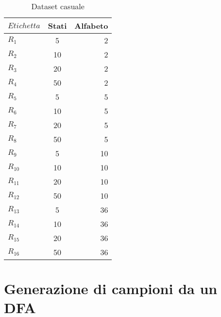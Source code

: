 \begin{table}[htp]
\centering 
\begin{tabular}{lcr} 
\toprule
$Etichetta$ & Stati & Alfabeto  \\
 \midrule
 $R_{1}$ & 5 & 2 \\
 $R_{2}$ & 10 & 2  \\
 $R_{3}$ & 20 & 2  \\
 $R_{4}$ & 50 & 2\\
 $R_{5}$ & 5 & 5\\
  $R_{6}$ & 10 & 5  \\
 
 $R_{7}$ & 20 & 5  \\

 $R_{8}$ & 50 & 5 \\
 
  $R_{9}$ & 5 & 10  \\

 $R_{10}$ & 10 & 10  \\
 $R_{11}$ & 20 & 10\\
 
 $R_{12}$ & 50 & 10 \\
 
 $R_{13}$ & 5 & 36 \\
    
 $R_{14}$ & 10 & 36 \\
 
 $R_{15}$ & 20 & 36 \\

 $R_{16}$ & 50 & 36 \\
 \bottomrule
\end{tabular}

 \caption[Dataset casuale]{Dataset casuale}
\label{tab:tom}
\end{table} 

\section[Gen. campioni da DFA]{Generazione di campioni da un DFA}
\label{sec:gensam}

